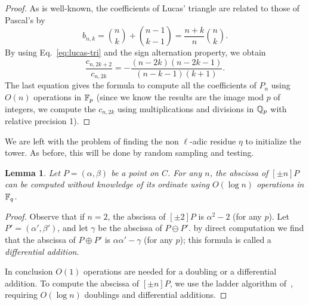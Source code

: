 \documentclass{sig-alternate}
\newtheorem{lemma}[definition]{Lemma}
\begin{document}
\begin{proof}
  As is well-known, the coefficients of
  Lucas' triangle are related to those of Pascal's by
  \begin{equation}
    \label{eq:lucas-tri}
    b_{n,k} = \binom{n}{k} + \binom{n-1}{k-1} = \frac{n+k}{n}\binom{n}{k}.
  \end{equation}
  By using Eq.~\eqref{eq:lucas-tri} and the sign alternation property,
  we obtain 
  \begin{equation*}
    \frac{c_{n,2k+2}}{c_{n,2k}} = 
    -\frac{(n-2k)(n-2k-1)}{(n-k-1)(k+1)}.
  \end{equation*}
  The last equation gives the formula to compute all the coefficients
  of $P_n$ using $O(n)$ operations in $\mathbb{F}_p$ (since we know the
  results are the image mod $p$ of integers, we compute the $c_{n,2k}$
  using multiplications and divisions in $\mathbb{Q}_p$ with relative
  precision 1).
\end{proof}

We are left with the problem of finding the non $\ell$-adic residue
$\eta$ to initialize the tower. As before, this will be done by random
sampling and testing.

\begin{lemma}
  \label{th:montgomery}
  Let $P=(\alpha,\beta)$ be a point on $C$. For any $n$, the abscissa of $[\pm
  n]P$ can be computed without knowledge of its ordinate using $O(\log
  n)$ operations in $\mathbb{F}_q$.
\end{lemma}
\begin{proof}
  Observe that if $n=2$, the abscissa of $[\pm 2]P$ is $\alpha^2-2$
  (for any $p$).  Let $P'=(\alpha',\beta')$, and let $\gamma$ be the
  abscissa of $P\ominus P'$. by direct computation we find that the
  abscissa of $P\oplus P'$ is $\alpha\alpha'-\gamma$ (for any $p$);
  this formula is called a \emph{differential addition}.

  In conclusion $O(1)$ operations are needed for a doubling or a
  differential addition. To compute the abscissa of $[\pm n]P$, we use
  the ladder algorithm of~\cite{montgomery}, requiring $O(\log n)$
  doublings and differential additions.
\end{proof}
\end{document}
